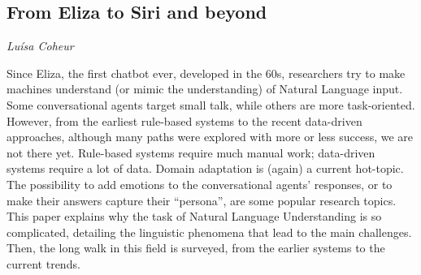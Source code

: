 \documentclass[../booklet.tex]{subfiles}
\begin{document}
\subsection[From Eliza to Siri and beyond. {\it Luísa Coheur}]{From Eliza to Siri and beyond}

\begin{center}
  {\it Luísa Coheur}
\end{center}



Since Eliza, the first chatbot ever, developed in the 60s, researchers try to make machines understand (or mimic the understanding) of Natural Language input. Some conversational agents target small talk, while others are more task-oriented. However, from the earliest rule-based systems to the recent data-driven approaches, although many paths were explored with more or less success, we are not there yet. Rule-based systems require much manual work; data-driven systems require a lot of data. Domain adaptation is (again) a current hot-topic. The possibility to add emotions to the conversational agents' responses, or to make their answers capture their ``persona'', are some popular research topics. 
This paper explains why the task of Natural Language Understanding is so complicated, detailing the linguistic phenomena that lead to the main challenges. Then, the long walk in this field is surveyed, from the earlier systems to the current trends.
\end{document}
